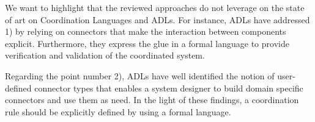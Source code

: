 We want to highlight that the reviewed approaches do not leverage on the state of art on Coordination Languages and ADLs. For instance, ADLs have addressed 1) by relying on connectors that make the interaction between components explicit. Furthermore, they express the glue in a formal language to provide verification and validation of the coordinated system. 
		
Regarding the point number 2), ADLs have well identified the notion of user-defined connector types that enables a system designer to build domain specific connectors and use them as need. In the light of these findings, a coordination rule should be explicitly defined by using a formal language. 	
	 	
 		 		
 		
 		
 		
 		
	
